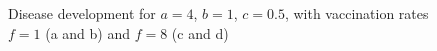 \begin{figure}[H]
    \caption{Disease development for $a=4$, $b=1$, $c=0.5$, with vaccination rates $f=1$ (a and b) and $f=8$ (c and d)}
    \label{fig:latevacc}
\end{figure}

